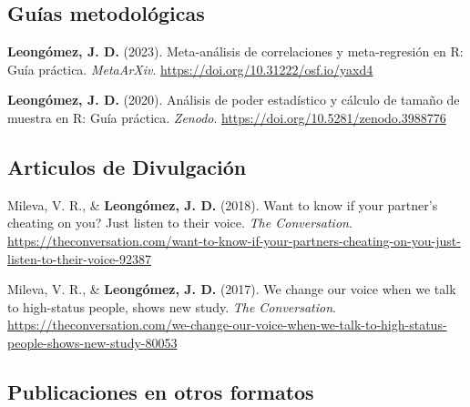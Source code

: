 \documentclass[11pt,a4paper,]{awesome-cv}
\begin{document}
\endgroup

\hypertarget{guuxedas-metodoluxf3gicas}{%
\subsection{Guías metodológicas}\label{guuxedas-metodoluxf3gicas}}

\begingroup
\footnotesize
\setlength{\parindent}{-0.5in}
\setlength{\leftskip}{0.5in}

\textbf{Leongómez, J. D.} (2023). Meta-análisis de correlaciones y
meta-regresión en R: Guía práctica. \emph{MetaArXiv}.
\url{https://doi.org/10.31222/osf.io/yaxd4}

\textbf{Leongómez, J. D.} (2020). Análisis de poder estadístico y
cálculo de tamaño de muestra en R: Guía práctica. \emph{Zenodo}.
\url{https://doi.org/10.5281/zenodo.3988776}

\endgroup

\hypertarget{articulos-de-divulgaciuxf3n}{%
\subsection{Articulos de
Divulgación}\label{articulos-de-divulgaciuxf3n}}

\begingroup
\footnotesize
\setlength{\parindent}{-0.5in}
\setlength{\leftskip}{0.5in}

Mileva, V. R., \& \textbf{Leongómez, J. D.} (2018). Want to know if your
partner's cheating on you? Just listen to their voice. \emph{The
Conversation}.
\url{https://theconversation.com/want-to-know-if-your-partners-cheating-on-you-just-listen-to-their-voice-92387}

Mileva, V. R., \& \textbf{Leongómez, J. D.} (2017). We change our voice
when we talk to high-status people, shows new study. \emph{The
Conversation}.
\url{https://theconversation.com/we-change-our-voice-when-we-talk-to-high-status-people-shows-new-study-80053}

\endgroup

\hypertarget{publicaciones-en-otros-formatos}{%
\subsection{Publicaciones en otros
formatos}\label{publicaciones-en-otros-formatos}}
\end{document}

